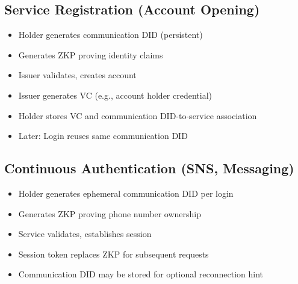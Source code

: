 \subsection{Service Registration (Account Opening)}

\begin{itemize}
  \item Holder generates communication DID (persistent)
  \item Generates ZKP proving identity claims
  \item Issuer validates, creates account
  \item Issuer generates VC (e.g., account holder credential)
  \item Holder stores VC and communication DID-to-service association
  \item Later: Login reuses same communication DID
\end{itemize}

\subsection{Continuous Authentication (SNS, Messaging)}

\begin{itemize}
  \item Holder generates ephemeral communication DID per login
  \item Generates ZKP proving phone number ownership
  \item Service validates, establishes session
  \item Session token replaces ZKP for subsequent requests
  \item Communication DID may be stored for optional reconnection hint
\end{itemize}

